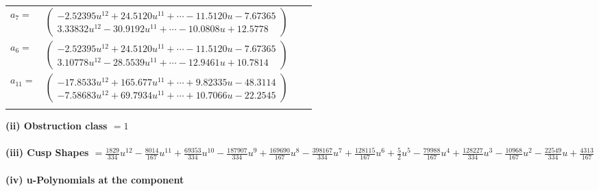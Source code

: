 \documentclass[1p]{elsarticle_modified}
\theoremstyle{definition}
\begin{document}
\begin{tabular}{m{7pt} m{180pt} m{7pt} m{180pt} }
\flushright $a_{7}=$&$\begin{pmatrix}-2.52395 u^{12}+24.5120 u^{11}+\cdots-11.5120 u-7.67365\\3.33832 u^{12}-30.9192 u^{11}+\cdots-10.0808 u+12.5778\end{pmatrix}$ \\
\flushright $a_{6}=$&$\begin{pmatrix}-2.52395 u^{12}+24.5120 u^{11}+\cdots-11.5120 u-7.67365\\3.10778 u^{12}-28.5539 u^{11}+\cdots-12.9461 u+10.7814\end{pmatrix}$ \\
\flushright $a_{11}=$&$\begin{pmatrix}-17.8533 u^{12}+165.677 u^{11}+\cdots+9.82335 u-48.3114\\-7.58683 u^{12}+69.7934 u^{11}+\cdots+10.7066 u-22.2545\end{pmatrix}$\\&\end{tabular}
\flushleft \textbf{(ii) Obstruction class $= 1$}\\~\\
\flushleft \textbf{(iii) Cusp Shapes $= \frac{1829}{334} u^{12}-\frac{8014}{167} u^{11}+\frac{69353}{334} u^{10}-\frac{187907}{334} u^9+\frac{169690}{167} u^8-\frac{398167}{334} u^7+\frac{128115}{167} u^6+\frac{5}{2} u^5-\frac{79988}{167} u^4+\frac{128227}{334} u^3-\frac{10968}{167} u^2-\frac{22549}{334} u+\frac{4313}{167}$}\\~\\
\newpage\renewcommand{\arraystretch}{1}
\flushleft \textbf{(iv) u-Polynomials at the component}\newline \\
\end{document}
